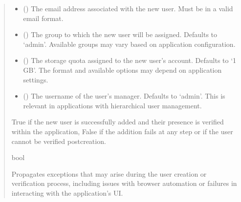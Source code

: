 \documentclass[letterpaper,10pt,english]{sphinxmanual}
\begin{document}
\begin{fulllineitems}
\begin{quote}
\begin{description}
\begin{itemize}
\item {} 
\sphinxAtStartPar
{} () \textendash{} The email address associated with the new user. Must be in a valid email format.

\item {} 
\sphinxAtStartPar
{} (\sphinxstyleliteralemphasis{\sphinxupquote{, }}) \textendash{} The group to which the new user will be assigned. Defaults to ‘admin’.
Available groups may vary based on application configuration.

\item {} 
\sphinxAtStartPar
{} (\sphinxstyleliteralemphasis{\sphinxupquote{, }}) \textendash{} The storage quota assigned to the new user’s account. Defaults to ‘1 GB’. The format
and available options may depend on application settings.

\item {} 
\sphinxAtStartPar
{} (\sphinxstyleliteralemphasis{\sphinxupquote{, }}) \textendash{} The username of the user’s manager. Defaults to ‘admin’. This is relevant in
applications with hierarchical user management.

\end{itemize}

\sphinxAtStartPar
True if the new user is successfully added and their presence is verified within the application,
False if the addition fails at any step or if the user cannot be verified post\sphinxhyphen{}creation.

\sphinxAtStartPar
bool

\sphinxAtStartPar
{} \textendash{} Propagates exceptions that may arise during the user creation or verification process, including
issues with browser automation or failures in interacting with the application’s UI.

\end{description}\end{quote}


\end{fulllineitems}
\end{document}
